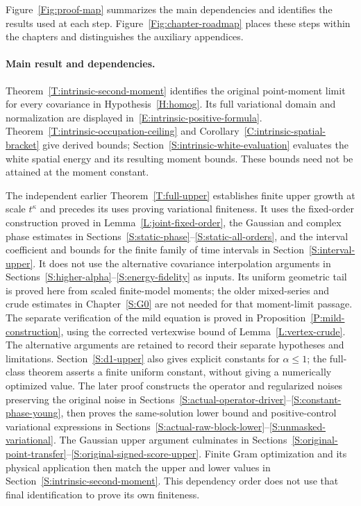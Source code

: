 \documentclass[12pt,oneside,openany]{book}
\numberwithin{equation}{section}
\theoremstyle{nogostyle}
\theoremstyle{definition}
\begin{document}
Figure~\ref{Fig:proof-map} summarizes the main dependencies and identifies
the results used at each step. Figure~\ref{Fig:chapter-roadmap} places these
steps within the chapters and distinguishes the auxiliary appendices.


\paragraph{Main result and dependencies.}
Theorem~\ref{T:intrinsic-second-moment} identifies the original point-moment
limit for every covariance in Hypothesis~\ref{H:homog}. Its full variational
domain and normalization are displayed in~\eqref{E:intrinsic-positive-formula}.
Theorem~\ref{T:intrinsic-occupation-ceiling} and
Corollary~\ref{C:intrinsic-spatial-bracket} give derived bounds;
Section~\ref{S:intrinsic-white-evaluation} evaluates the white spatial energy
and its resulting moment bounds. These bounds need not be attained at the moment
constant.

The independent earlier Theorem~\ref{T:full-upper} establishes finite upper
growth at scale $t^\kappa$ and precedes its uses proving variational finiteness.
It uses the fixed-order construction proved in Lemma~\ref{L:joint-fixed-order},
the Gaussian and complex phase estimates in
Sections~\ref{S:static-phase}--\ref{S:static-all-orders}, and the interval
coefficient and bounds for the finite family of time intervals in
Section~\ref{S:interval-upper}. It does not use the alternative covariance
interpolation arguments in
Sections~\ref{S:higher-alpha}--\ref{S:energy-fidelity} as inputs. Its uniform
geometric tail is proved here from scaled finite-model moments; the older
mixed-series and crude estimates in Chapter~\ref{S:G0} are not needed for that
moment-limit passage. The separate verification of the mild equation is proved
in Proposition~\ref{P:mild-construction}, using the corrected vertexwise bound
of Lemma~\ref{L:vertex-crude}. The alternative arguments are retained to record
their separate hypotheses and limitations. Section~\ref{S:d1-upper} also gives
explicit constants for $\alpha \le 1$; the full-class theorem asserts a finite
uniform constant, without giving a numerically optimized value. The later proof
constructs the operator and regularized noises preserving the original noise in
Sections~\ref{S:actual-operator-driver}--\ref{S:constant-phase-young}, then
proves the same-solution lower bound and positive-control variational
expressions in
Sections~\ref{S:actual-raw-block-lower}--\ref{S:unmasked-variational}. The
Gaussian upper argument culminates in
Sections~\ref{S:original-point-transfer}--\ref{S:original-signed-score-upper}.
Finite Gram optimization and its physical application then match the upper and
lower values in Section~\ref{S:intrinsic-second-moment}. This dependency order
does not use that final identification to prove its own finiteness.
\end{document}
